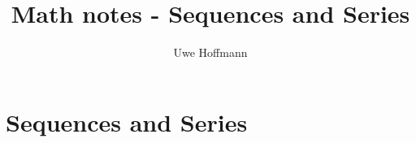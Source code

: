 

\title{Math notes - Sequences and Series}
\author{Uwe Hoffmann}



\setcounter{chapter}{1}
\chapter*{Sequences and Series}
